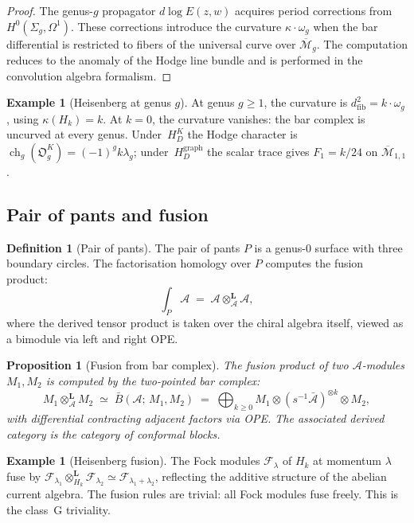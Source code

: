 \documentclass[11pt,reqno]{amsart}
\newtheorem{proposition}[theorem]{Proposition}
\theoremstyle{definition}
\newtheorem{definition}[theorem]{Definition}
\newtheorem{example}[theorem]{Example}
\theoremstyle{remark}
\providecommand{\cA}{\mathcal{A}}
\providecommand{\cM}{\mathcal{M}}
\providecommand{\barB}{\bar{B}}
\providecommand{\cF}{\mathcal{F}}
\begin{document}
\begin{proof}
The genus-$g$ propagator $d\log E(z,w)$ acquires period
corrections from $H^0(\Sigma_g, \Omega^1)$. These corrections
introduce the curvature $\kappa \cdot \omega_g$ when the bar
differential is restricted to fibers of the universal curve
over $\overline{\cM}_g$. The computation reduces to the
anomaly of the Hodge line bundle and is performed in the
convolution algebra formalism.
\end{proof}

\begin{example}[Heisenberg at genus $g$]\label{ex:e-heis-genus}
At genus $g \ge 1$, the curvature is
$d_{\mathrm{fib}}^2 = k \cdot \omega_g$, using
$\kappa(H_k) = k$. At $k = 0$, the curvature vanishes: the
bar complex is uncurved at every genus. Under~$H_D^K$ the Hodge
character is $\operatorname{ch}_g(\mathfrak O_g^K)=(-1)^gk\lambda_g$;
under~$H_D^{\mathrm{graph}}$ the scalar trace gives
$F_1=k/24$ on
$\overline{\cM}_{1,1}$.
\end{example}

\subsection{Pair of pants and fusion}

\begin{definition}[Pair of pants]\label{def:e-pants}
The pair of pants $P$ is a genus-$0$ surface with three boundary
circles. The factorisation homology over $P$ computes the fusion
product:
\[
\int_P \cA \;=\; \cA \otimes_{\cA}^{\mathbf{L}} \cA,
\]
where the derived tensor product is taken over the chiral algebra
itself, viewed as a bimodule via left and right OPE.
\end{definition}

\begin{proposition}[Fusion from bar complex]\label{prop:e-fusion}
The fusion product of two $\cA$-modules $M_1, M_2$ is computed
by the two-pointed bar complex:
\[
M_1 \otimes_\cA^{\mathbf{L}} M_2
\;\simeq\;
\barB(\cA;\, M_1, M_2)
\;=\;
\bigoplus_{k \ge 0}
M_1 \otimes (s^{-1}\bar{\cA})^{\otimes k} \otimes M_2,
\]
with differential contracting adjacent factors via OPE. The
associated derived category is the category of conformal blocks.
\end{proposition}

\begin{example}[Heisenberg fusion]\label{ex:e-heis-fusion}
The Fock modules $\cF_\lambda$ of $H_k$ at momentum $\lambda$
fuse by
$\cF_{\lambda_1} \otimes_{H_k}^{\mathbf{L}} \cF_{\lambda_2}
\simeq \cF_{\lambda_1 + \lambda_2}$,
reflecting the additive structure of the abelian current
algebra. The fusion rules are trivial: all Fock modules fuse
freely. This is the class~G triviality.
\end{example}
\end{document}
